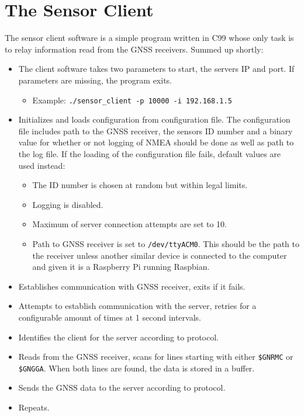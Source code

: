 \documentclass[12pt,english,a4paper]{report}
\begin{document}
\section{The Sensor Client}\label{sensor_client}
The sensor client software is a simple program written in C99 whose only task is to relay information read from the GNSS receivers. Summed up shortly:
\begin{itemize}
  \item The client software takes two parameters to start, the servers IP and port. If parameters are missing, the program exits.
  \begin{itemize}
    \item Example: \texttt{./sensor\_client -p 10000 -i 192.168.1.5}
  \end{itemize}
  \item Initializes and loads configuration from configuration file. The configuration file includes path to the GNSS receiver, the sensors ID number and a binary value for whether or not logging of NMEA should be done as well as path to 
  the log file. If the loading of the configuration file fails, default values are used instead:
  \begin{itemize}
    \item The ID number is chosen at random but within legal limits.
    \item Logging is disabled.
    \item Maximum of server connection attempts are set to 10.
    \item Path to GNSS receiver is set to \texttt{/dev/ttyACM0}. This should be the path to the receiver unless another similar device is connected to the computer and given it is a Raspberry Pi running Raspbian.
  \end{itemize}
  \item Establishes communication with GNSS receiver, exits if it fails.
  \item Attempts to establish communication with the server, retries for a configurable amount of times at 1 second intervals.
  \item Identifies the client for the server according to protocol.
  \item Reads from the GNSS receiver, scans for lines starting with either \texttt{\$GNRMC} or \texttt{\$GNGGA}. When both lines are found, the data is stored in a buffer.
  \item Sends the GNSS data to the server according to protocol.
  \item Repeats.
\end{itemize}
\end{document}
